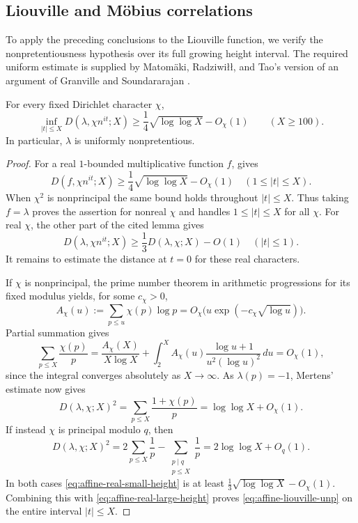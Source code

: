 \subsection{Liouville and M\"obius correlations}

To apply the preceding conclusions to the Liouville function, we verify
the nonpretentiousness hypothesis over its full growing height interval.
The required uniform estimate is supplied by
Matom\"aki, Radziwi{\l}{\l}, and Tao's version of an argument of
Granville and Soundararajan \cite[Appendix~C]{MRT15}.

\begin{lemma}
\label{lem:affine-liouville-unp}
For every fixed Dirichlet character $\chi$,
\begin{equation}
 \inf_{|t|\le X}D(\lambda,\chi n^{it};X)
 \ge \frac14\sqrt{\log\log X}-O_\chi(1)
 \qquad(X\ge100).
 \label{eq:affine-liouville-unp}
\end{equation}
In particular, $\lambda$ is uniformly nonpretentious.
\end{lemma}

\begin{proof}
For a real $1$-bounded multiplicative function $f$,
\cite[Lemma~C.1]{MRT15} gives
\begin{equation}
 D(f,\chi n^{it};X)
 \ge\frac14\sqrt{\log\log X}-O_\chi(1)
 \quad(1\le|t|\le X).
 \label{eq:affine-real-large-height}
\end{equation}
When $\chi^2$ is nonprincipal the same bound holds throughout
$|t|\le X$. Thus taking $f=\lambda$ proves the assertion for nonreal
$\chi$ and handles $1\le|t|\le X$ for all $\chi$.
For real $\chi$, the other part of the cited lemma gives
\begin{equation}
 D(\lambda,\chi n^{it};X)
 \ge\frac13D(\lambda,\chi;X)-O(1)
 \quad(|t|\le1).
 \label{eq:affine-real-small-height}
\end{equation}
It remains to estimate the distance at $t=0$ for these real characters.

If $\chi$ is nonprincipal, the prime number theorem in arithmetic
progressions for its fixed modulus yields, for some $c_\chi>0$,
\[
 A_\chi(u):=\sum_{p\le u}\chi(p)\log p
 =O_\chi\bigl(u\exp(-c_\chi\sqrt{\log u})\bigr).
\]
Partial summation gives
\[
 \sum_{p\le X}\frac{\chi(p)}p
 =\frac{A_\chi(X)}{X\log X}
   +\int_2^X A_\chi(u)
     \frac{\log u+1}{u^2(\log u)^2}\,du
 =O_\chi(1),
\]
since the integral converges absolutely as $X\to\infty$.
As $\lambda(p)=-1$, Mertens' estimate now gives
\[
 D(\lambda,\chi;X)^2
 =\sum_{p\le X}\frac{1+\chi(p)}p
 =\log\log X+O_\chi(1).
\]
If instead $\chi$ is principal modulo $q$, then
\[
 D(\lambda,\chi;X)^2
 =2\sum_{p\le X}\frac1p
  -\sum_{\substack{p\mid q\\p\le X}}\frac1p
 =2\log\log X+O_q(1).
\]
In both cases \eqref{eq:affine-real-small-height} is at least
$\frac13\sqrt{\log\log X}-O_\chi(1)$. Combining this with
\eqref{eq:affine-real-large-height} proves
\eqref{eq:affine-liouville-unp} on the entire interval $|t|\le X$.
\end{proof}

